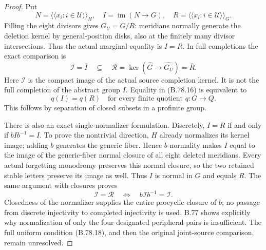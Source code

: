 \begin{proof}
Put
\[
 N=\langle\!\langle x_i:i\in\mathcal U\rangle\!\rangle_H,
 \quad I=\operatorname{im}(N\to G),
 \quad R=\langle\!\langle x_i:i\in\mathcal U\rangle\!\rangle_G.
 \tag{B.78.15}
\]
Filling the eight divisors gives \(G_U=G/R\): meridians normally
generate the deletion kernel by general-position disks, also at the
finitely many divisor intersections. Thus the actual marginal equality
is \(I=R\). In full completions the exact comparison is
\[
 \mathcal I=\overline I\quad\subseteq\quad
 \mathcal R=\ker(\widehat G\longrightarrow\widehat{G_U})
             =\overline R.
 \tag{B.78.16}
\]
Here \(\mathcal I\) is the compact image of the actual source
completion kernel. It is not the full completion of the abstract
group \(I\). Equality in (B.78.16) is equivalent to
\[
       q(I)=q(R)\quad\text{for every finite quotient }q:G\to Q.
 \tag{B.78.17}
\]
This follows by separation of closed subsets in a profinite group.

There is also an exact single-normalizer formulation. Discretely,
\(I=R\) if and only if \(bIb^{-1}=I\). To prove the nontrivial
direction, \(H\) already normalizes its kernel image; adding \(b\)
generates the generic fiber. Hence \(b\)-normality makes \(I\) equal
to the image of the generic-fiber normal closure of all eight deleted
meridians. Every actual forgetting monodromy preserves this normal
closure, so the two retained stable letters preserve its image as well.
Thus \(I\) is normal in \(G\) and equals \(R\). The same argument
with closures proves
\[
             \mathcal I=\mathcal R
       \quad\Longleftrightarrow\quad b\mathcal I b^{-1}=\mathcal I.
 \tag{B.78.18}
\]
Closedness of the normalizer supplies the entire procyclic closure of
\(b\); no passage from discrete injectivity to completed injectivity
is used. B.77 shows explicitly why normalization of only the four
designated peripheral pairs is insufficient. The full uniform
condition (B.78.18), and then the original joint-source comparison,
remain unresolved.
\end{proof}
